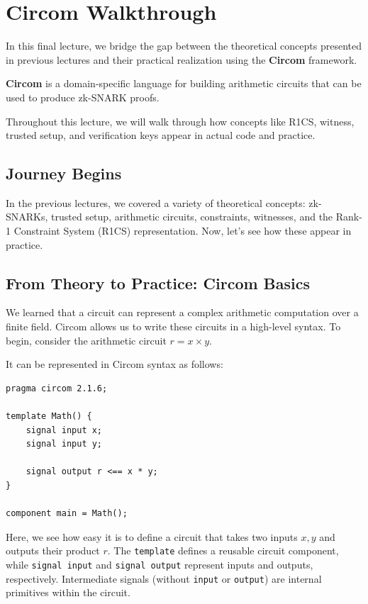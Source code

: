 \documentclass[../lecture-notes.tex]{subfiles}
\begin{document}
    \section{Circom Walkthrough}

    In this final lecture, we bridge the gap between the theoretical concepts presented in previous lectures and their practical realization using the \textbf{Circom} framework.

    \begin{definition}
        \textbf{Circom} is a domain-specific language for building arithmetic circuits that can be used to produce zk-SNARK proofs.
    \end{definition}

    Throughout this lecture, we will walk through how concepts like R1CS, witness, trusted setup, and verification keys appear in actual code and practice.

    \subsection{Journey Begins}

    In the previous lectures, we covered a variety of theoretical concepts: zk-SNARKs, trusted setup, arithmetic circuits, constraints, witnesses, and the Rank-1 Constraint System (R1CS) representation.
    Now, let's see how these appear in practice.

    \subsection{From Theory to Practice: Circom Basics}

    We learned that a circuit can represent a complex arithmetic computation over a finite field.
    Circom allows us to write these circuits in a high-level syntax.
    To begin, consider the arithmetic circuit $r = x \times y$.

    It can be represented in Circom syntax as follows:

    \begin{lstlisting}[language=Circom,numbers=none]
pragma circom 2.1.6;

template Math() {
    signal input x;
    signal input y;

    signal output r <== x * y;
}

component main = Math();
    \end{lstlisting}

    Here, we see how easy it is to define a circuit that takes two inputs $x,y$ and outputs their product $r$.
    The \texttt{template} defines a reusable circuit component, while \texttt{signal input} and \texttt{signal output} represent inputs and outputs, respectively.
    Intermediate signals (without \texttt{input} or \texttt{output}) are internal primitives within the circuit.
\end{document}
